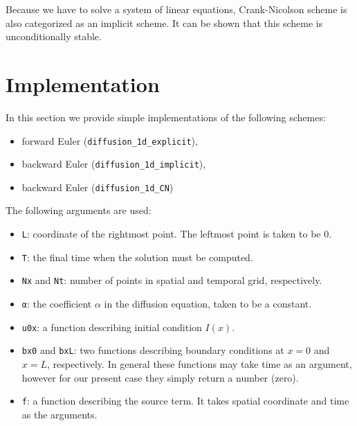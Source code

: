 \documentclass[a4paper,11pt]{article}
\newcommand{\jlinline}[1]{\texttt{#1}}
\begin{document}
Because we have to solve a system of linear equations, Crank-Nicolson scheme is also
categorized as an implicit scheme. It can be shown that this scheme is unconditionally
stable.



\section{Implementation}

In this section we provide simple implementations of the following schemes:
\begin{itemize}
\item forward Euler (\jlinline{diffusion_1d_explicit}),
\item backward Euler (\jlinline{diffusion_1d_implicit}),
\item backward Euler (\jlinline{diffusion_1d_CN})
\end{itemize}

The following arguments are used:
\begin{itemize}
\item \jlinline{L}: coordinate of the rightmost point. The leftmost point is taken to be 0.
\item \jlinline{T}: the final time when the solution must be computed.
\item \jlinline{Nx} and \jlinline{Nt}: number of points in spatial and temporal grid, respectively.
\item \jlinline{α}: the coefficient $\alpha$ in the diffusion equation, taken to be a constant.
\item \jlinline{u0x}: a function describing initial condition $I(x)$.
\item \jlinline{bx0} and \jlinline{bxL}: two functions describing boundary conditions at $x=0$ and
$x=L$, respectively. In general these functions may take time as an argument, however for our present case
they simply return a number (zero).
\item \jlinline{f}: a function describing the source term. It takes spatial coordinate and time as the
arguments.
\end{itemize}
\end{document}

